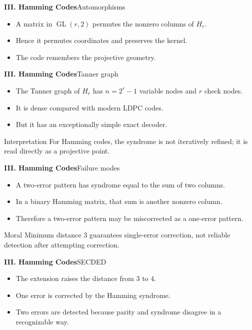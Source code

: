 \begin{frame}{\textbf{III. Hamming Codes}}{Automorphisms}
\small
{}
\begin{itemize}
  \item A matrix in $\operatorname{GL}(r,2)$ permutes the nonzero columns of $H_r$.
  \item Hence it permutes coordinates and preserves the kernel.
  \item The code remembers the projective geometry.
\end{itemize}
\end{frame}

\begin{frame}{\textbf{III. Hamming Codes}}{Tanner graph}
\small
\begin{itemize}
  \item The Tanner graph of $H_r$ has $n=2^r-1$ variable nodes and $r$ check nodes.
  \item It is dense compared with modern LDPC codes.
  \item But it has an exceptionally simple exact decoder.
\end{itemize}
\begin{block}{Interpretation}
For Hamming codes, the syndrome is not iteratively refined; it is read directly as a projective point.
\end{block}
\end{frame}

\begin{frame}{\textbf{III. Hamming Codes}}{Failure modes}
\small
\begin{itemize}
  \item A two-error pattern has syndrome equal to the sum of two columns.
  \item In a binary Hamming matrix, that sum is another nonzero column.
  \item Therefore a two-error pattern may be miscorrected as a one-error pattern.
\end{itemize}
\begin{block}{Moral}
Minimum distance $3$ guarantees single-error correction, not reliable detection after attempting correction.
\end{block}
\end{frame}

\begin{frame}{\textbf{III. Hamming Codes}}{SECDED}
\small
{}
\begin{itemize}
  \item The extension raises the distance from $3$ to $4$.
  \item One error is corrected by the Hamming syndrome.
  \item Two errors are detected because parity and syndrome disagree in a recognizable way.
\end{itemize}
\end{frame}

